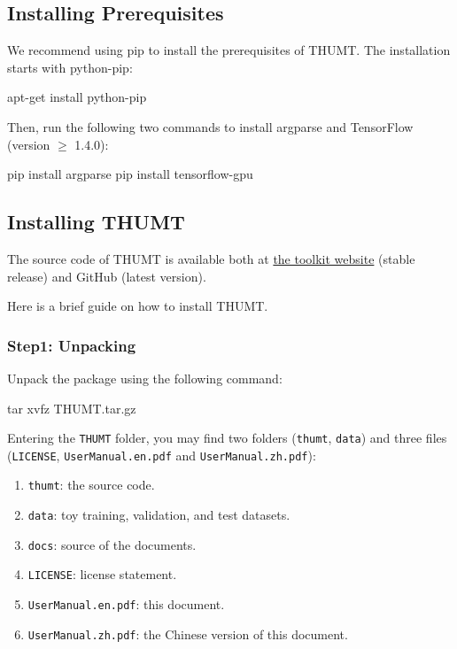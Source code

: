 \documentclass{article}
\begin{document}
\subsection{Installing Prerequisites}
We recommend using pip to install the prerequisites of THUMT. The installation starts with python-pip:
\begin{everbatim}
apt-get install python-pip
\end{everbatim}

Then, run the following two commands to install argparse and TensorFlow (version $\ge$ 1.4.0):

\begin{everbatim}
pip install argparse
pip install tensorflow-gpu
\end{everbatim}

\subsection{Installing THUMT}
The source code of THUMT is available both at \href{http://thumt.thunlp.org}{the toolkit website} (stable release) and GitHub (latest version).

Here is a brief guide on how to install THUMT.

\subsubsection{Step1: Unpacking}
Unpack the package using the following command:

\begin{everbatim}
tar xvfz THUMT.tar.gz
\end{everbatim}

Entering the \verb|THUMT| folder, you may find two folders (\verb|thumt|, \verb|data|) and three files (\verb|LICENSE|, \verb|UserManual.en.pdf| and \verb|UserManual.zh.pdf|):
\begin{enumerate}
\item \verb|thumt|: the source code.
\item \verb|data|: toy training, validation, and test datasets.
\item \verb|docs|: source of the documents.
\item \verb|LICENSE|: license statement.
\item \verb|UserManual.en.pdf|: this document.
\item \verb|UserManual.zh.pdf|: the Chinese version of this document.
\end{enumerate}
\end{document}
